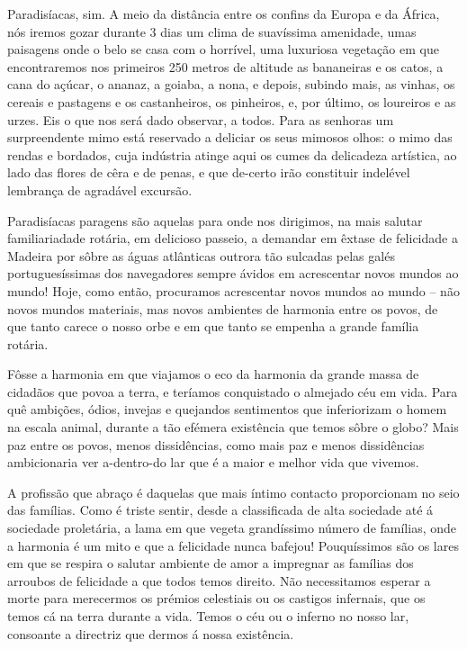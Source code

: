 \documentclass[9pt]{article}
\begin{document}
{Paradisíacas, sim. A meio da distância entre os confins da Europa e da
África, nós iremos gozar durante 3 dias um clima de suavíssima amenidade,
umas paisagens onde o belo se casa com o horrível, uma luxuriosa vegeta\-ção
em que encontraremos nos primeiros 250 metros de altitude as bananeiras e
os catos, a cana do açúcar, o ananaz, a goiaba, a nona, e depois, subindo mais,
as vinhas, os cereais e pastagens e os castanheiros, os pinheiros, e, por último, os loureiros e as urzes. Eis o que nos será dado observar, a todos. Para
as senhoras um surpreendente mimo está reservado a deliciar os seus mimosos
o\-lhos: o mimo das rendas e bordados, cuja indústria atinge aqui os cumes
da delicadeza artística, ao lado das flores de cêra e de penas, e que de-certo
irão constituir indelével lembran\-ça de a\-gra\-dá\-vel excursão.

Paradisíacas paragens são aquelas para onde nos dirigimos, na mais salutar familiariadade rotária, em delicioso passeio, a demandar em êxtase de
felicidade a Madeira por sôbre as águas atlânticas outrora tão sulcadas
pelas galés portuguesíssimas dos navegadores sempre ávidos em acrescentar
novos mundos ao mundo! Hoje, como então, procuramos acrescentar novos mundos
ao mundo -- não novos mundos materiais, mas novos ambientes de harmonia entre
os povos, de que tanto carece o nosso orbe e em que tanto se empenha a gran\-de fa\-mí\-lia rotária.

Fôsse a harmonia em que viajamos o eco da harmonia da gran\-de massa de
cidadãos que povoa a terra, e teríamos conquistado o almejado céu em vida.
Para quê ambi\-ções, ódios, invejas e quejandos sentimentos que inferiorizam o
homem na escala animal, durante a tão efémera exis\-tên\-cia que temos sôbre o
globo? Mais paz entre os povos, menos dissidên\-cias, como mais paz e menos
dissidên\-cias ambicionaria ver a-dentro-do lar que é a maior e me\-lhor vida
que vivemos.

A profissão que abraço é daquelas que mais íntimo contacto proporcionam no seio das fa\-mí\-lias. Como é triste sentir, desde a classifi\-cada de alta
sociedade até á sociedade proletária, a lama em que vegeta grandíssimo número de fa\-mí\-lias, onde a harmonia é um mito e que a felicidade nunca bafejou!
Pouquís\-si\-mos são os lares em que se respira o salutar ambiente de amor a
impregnar as fa\-mí\-lias dos arroubos de felicidade a que todos temos direito.
Não necessitamos esperar a morte para merecermos os prémios celestiais ou
os castigos infernais, que os temos cá na terra durante a vida. Temos o céu
ou o inferno no nosso lar, consoante a directriz que dermos á nossa exis\-tên\-cia.

}
\end{document}

